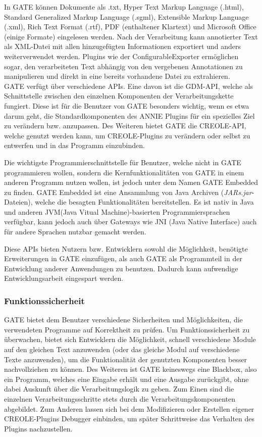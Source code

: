 \documentclass[12pt]{report}
\begin{document}
In GATE können Dokumente als .txt, Hyper Text Markup Language (.html), Standard Generalized Markup Language (.sgml), Extensible Markup Language (.xml), Rich Text Format (.rtf), PDF (enthaltener Klartext) und Microsoft Office (einige Formate) eingelesen werden.
Nach der Verarbeitung kann annotierter Text als XML-Datei mit allen hinzugefügten Informationen exportiert und anders weiterverwendet werden. Plugins wie der ConfigurableExporter ermöglichen sogar, den verarbeiteten Text abhängig von den vergebenen Annotationen zu manipulieren und direkt in eine bereits vorhandene Datei zu extrahieren.\\

GATE verfügt über verschiedene APIs. Eine davon ist die GDM-API, welche als Schnittstelle zwischen den einzelnen Komponenten der Verarbeitungskette fungiert. Diese ist für die Benutzer von GATE besonders wichtig, wenn es etwa darum geht, die Standardkomponenten des ANNIE Plugins für ein spezielles Ziel zu verändern bzw. anzupassen. Des Weiteren bietet GATE die CREOLE-API, welche genutzt werden kann, um CREOLE-Plugins zu verändern oder selbst zu entwerfen und in das Programm einzubinden.

Die wichtigste Programmierschnittstelle für Benutzer, welche nicht in GATE programmieren wollen, sondern die Kernfunktionalitäten von GATE in einem anderen Programm nutzen wollen, ist jedoch unter dem Namen GATE Embedded zu finden. GATE Embedded ist eine Ansammlung von Java Archiven (\textit{JARs.jar}-Dateien), welche die besagten Funktionalitäten bereitstellen. Es ist nativ in Java und anderen JVM(Java Vitual Machine)-basierten Programmiersprachen verfügbar, kann jedoch auch über Gateways wie JNI (Java Native Interface) auch für andere Sprachen nutzbar gemacht werden.

Diese APIs bieten Nutzern bzw. Entwicklern sowohl die Möglichkeit, benötigte Erweiterungen in GATE einzufügen, als auch GATE als Programmteil in der Entwicklung anderer Anwendungen zu benutzen. Dadurch kann aufwendige Entwicklungsarbeit eingespart werden. 

\subsubsection{Funktionssicherheit}
GATE bietet dem Benutzer verschiedene Sicherheiten und Möglichkeiten, die verwendeten Programme auf Korrektheit zu prüfen. 
Um Funktionssicherheit zu überwachen, bietet sich Entwicklern die Möglichkeit, schnell verschiedene Module auf den gleichen Text anzuwenden (oder das gleiche Modul auf verschiedene Texte anzuwenden), um die Funktionalität der genutzten Komponenten besser nachvollziehen zu können. Des Weiteren ist GATE keineswegs eine Blackbox, also ein Programm, welches eine Eingabe erhält und eine Ausgabe zurückgibt, ohne dabei Auskunft über die Verarbeitungslogik zu geben. Zum Einen sind die einzelnen Verarbeitungsschritte stets durch die Verarbeitungskomponenten abgebildet. Zum Anderen lassen sich bei dem Modifizieren oder Erstellen eigener CREOLE-Plugins Debugger einbinden, um später Schrittweise das Verhalten des Plugins nachzustellen.
\end{document}
